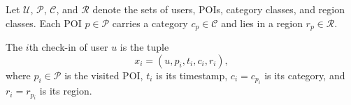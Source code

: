 Let $\mathcal{U}$, $\mathcal{P}$, $\mathcal{C}$, and $\mathcal{R}$ denote the sets of
users, POIs, category classes, and region classes. Each POI $p\in\mathcal{P}$ carries a
category $c_p\in\mathcal{C}$ and lies in a region $r_p\in\mathcal{R}$.

\begin{definition}[Check-in]\label{def:fund:checkin}
The $i$th check-in of user $u$ is the tuple
\begin{equation}
    x_i=(u,p_i,t_i,c_i,r_i),
\end{equation}
where $p_i\in\mathcal{P}$ is the visited POI, $t_i$ is its timestamp,
$c_i=c_{p_i}$ is its category, and $r_i=r_{p_i}$ is its region.
\end{definition}

